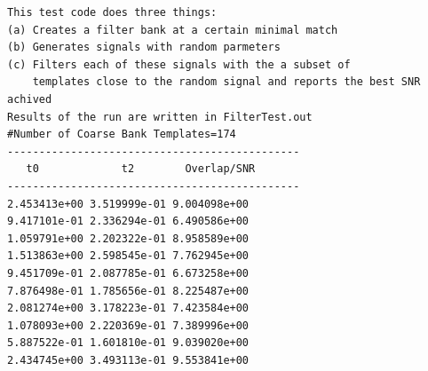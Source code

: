 \begin{verbatim}
This test code does three things:
(a) Creates a filter bank at a certain minimal match
(b) Generates signals with random parmeters
(c) Filters each of these signals with the a subset of
    templates close to the random signal and reports the best SNR achived
Results of the run are written in FilterTest.out
#Number of Coarse Bank Templates=174
----------------------------------------------
   t0             t2        Overlap/SNR
----------------------------------------------
2.453413e+00 3.519999e-01 9.004098e+00
9.417101e-01 2.336294e-01 6.490586e+00
1.059791e+00 2.202322e-01 8.958589e+00
1.513863e+00 2.598545e-01 7.762945e+00
9.451709e-01 2.087785e-01 6.673258e+00
7.876498e-01 1.785656e-01 8.225487e+00
2.081274e+00 3.178223e-01 7.423584e+00
1.078093e+00 2.220369e-01 7.389996e+00
5.887522e-01 1.601810e-01 9.039020e+00
2.434745e+00 3.493113e-01 9.553841e+00
\end{verbatim}

\newpage
